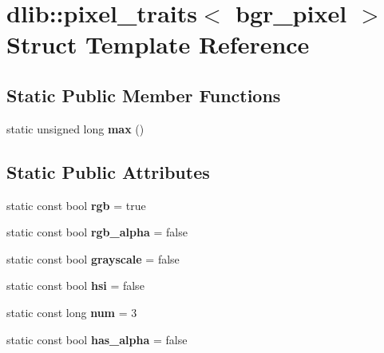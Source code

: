 \hypertarget{structdlib_1_1pixel__traits_3_01bgr__pixel_01_4}{
\section{dlib::pixel\_\-traits$<$ bgr\_\-pixel $>$ Struct Template Reference}
\label{structdlib_1_1pixel__traits_3_01bgr__pixel_01_4}
}
\subsection*{Static Public Member Functions}
\begin{DoxyCompactItemize}
\item 
\hypertarget{structdlib_1_1pixel__traits_3_01bgr__pixel_01_4_aca46cbf44ecfda9d55892ea857c8981a}{
static unsigned long {\bfseries max} ()}
\label{structdlib_1_1pixel__traits_3_01bgr__pixel_01_4_aca46cbf44ecfda9d55892ea857c8981a}

\end{DoxyCompactItemize}
\subsection*{Static Public Attributes}
\begin{DoxyCompactItemize}
\item 
\hypertarget{structdlib_1_1pixel__traits_3_01bgr__pixel_01_4_ae64be3fe89fc84125ebd87b801cb9622}{
static const bool {\bfseries rgb} = true}
\label{structdlib_1_1pixel__traits_3_01bgr__pixel_01_4_ae64be3fe89fc84125ebd87b801cb9622}

\item 
\hypertarget{structdlib_1_1pixel__traits_3_01bgr__pixel_01_4_a2a0e68764c422ca8409a009ee9f4559b}{
static const bool {\bfseries rgb\_\-alpha} = false}
\label{structdlib_1_1pixel__traits_3_01bgr__pixel_01_4_a2a0e68764c422ca8409a009ee9f4559b}

\item 
\hypertarget{structdlib_1_1pixel__traits_3_01bgr__pixel_01_4_a29ae2efc247f331ba87a9ece96db7c62}{
static const bool {\bfseries grayscale} = false}
\label{structdlib_1_1pixel__traits_3_01bgr__pixel_01_4_a29ae2efc247f331ba87a9ece96db7c62}

\item 
\hypertarget{structdlib_1_1pixel__traits_3_01bgr__pixel_01_4_a20bd2668bdb771f16944a2eed78f144a}{
static const bool {\bfseries hsi} = false}
\label{structdlib_1_1pixel__traits_3_01bgr__pixel_01_4_a20bd2668bdb771f16944a2eed78f144a}

\item 
\hypertarget{structdlib_1_1pixel__traits_3_01bgr__pixel_01_4_a4a89b7bad527dad5013ba70be9c6dd0e}{
static const long {\bfseries num} = 3}
\label{structdlib_1_1pixel__traits_3_01bgr__pixel_01_4_a4a89b7bad527dad5013ba70be9c6dd0e}

\item 
\hypertarget{structdlib_1_1pixel__traits_3_01bgr__pixel_01_4_a062aba3e7bc7feaf2e18bcb3daf5fd1c}{
static const bool {\bfseries has\_\-alpha} = false}
\label{structdlib_1_1pixel__traits_3_01bgr__pixel_01_4_a062aba3e7bc7feaf2e18bcb3daf5fd1c}

\end{DoxyCompactItemize}
